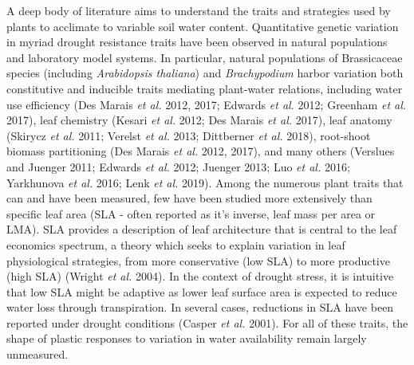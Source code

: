 \documentclass[jou,floatsintext]{apa6}
\begin{document}
A deep body of literature aims to understand the traits and strategies used by plants to acclimate to variable soil water content. Quantitative genetic variation in myriad drought resistance traits have been observed in natural populations and laboratory model systems. In particular, natural populations of Brassicaceae species (including \emph{Arabidopsis thaliana}) and \emph{Brachypodium} harbor variation both constitutive and inducible traits mediating plant-water relations, including water use efficiency (Des Marais \emph{et al.} 2012, 2017; Edwards \emph{et al.} 2012; Greenham \emph{et al.} 2017), leaf chemistry (Kesari \emph{et al.} 2012; Des Marais \emph{et al.} 2017), leaf anatomy (Skirycz \emph{et al.} 2011; Verelst \emph{et al.} 2013; Dittberner \emph{et al.} 2018), root-shoot biomass partitioning (Des Marais \emph{et al.} 2012, 2017), and many others (Verslues and Juenger 2011; Edwards \emph{et al.} 2012; Juenger 2013; Luo \emph{et al.} 2016; Yarkhunova \emph{et al.} 2016; Lenk \emph{et al.} 2019). Among the numerous plant traits that can and have been measured, few have been studied more extensively than specific leaf area (SLA - often reported as it's inverse, leaf mass per area or LMA). SLA provides a description of leaf architecture that is central to the leaf economics spectrum, a theory which seeks to explain variation in leaf physiological strategies, from more conservative (low SLA) to more productive (high SLA) (Wright \emph{et al.} 2004). In the context of drought stress, it is intuitive that low SLA might be adaptive as lower leaf surface area is expected to reduce water loss through transpiration. In several cases, reductions in SLA have been reported under drought conditions (Casper \emph{et al.} 2001). For all of these traits, the shape of plastic responses to variation in water availability remain largely unmeasured.
\end{document}
